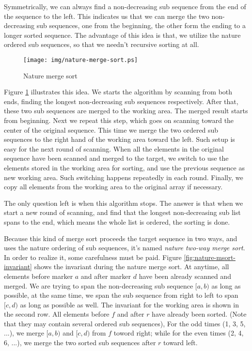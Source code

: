 \documentclass[UTF8]{article}
\begin{document}
Symmetrically, we can always find a non-decreasing sub sequence from the end of the sequence
to the left. This indicates us that we can merge the two non-decreasing sub sequences, one
from the beginning, the other form the ending to a longer sorted sequence. The advantage of
this idea is that, we utilize the nature ordered sub sequences, so that we needn't recursive
sorting at all.

\begin{figure}[htbp]
 \centering
 \texttt{[image: img/nature-merge-sort.ps]}
 \caption{Nature merge sort}
 \label{fig:nature-merge-sort}
\end{figure}

Figure \ref{fig:nature-merge-sort} illustrates this idea. We starts the algorithm by scanning
from both ends, finding the longest non-decreasing sub sequences respectively. After that,
these two sub sequences are merged to the working area. The merged result starts from beginning.
Next we repeat this step, which goes on scanning toward the center of the original sequence.
This time we merge the two ordered sub sequences to the right hand of the working area toward
the left. Such setup is easy for the next round of scanning. When all the elements
in the original sequence have been scanned and merged to the target, we switch to use the
elements stored in the working area for sorting, and use the previous sequence as new working area.
Such switching happens repeatedly in each round. Finally, we copy all elements from the
working area to the original array if necessary.

The only question left is when this algorithm stops. The answer is that when we start
a new round of scanning, and find that the longest non-decreasing sub list spans to the
end, which means the whole list is ordered, the sorting is done.

Because this kind of merge sort proceeds the target sequence in two ways, and uses the
nature ordering of sub sequences, it's named {\em nature two-way merge sort}. In order
to realize it, some carefulness must be paid. Figure \ref{fig:nature-msort-invariant}
shows the invariant during the nature merge sort. At anytime, all elements before marker
$a$ and after marker $d$ have been already scanned and merged. We are trying to
span the non-decreasing sub sequence $[a, b)$ as long as possible, at the same time,
we span the sub sequence from right to left to span $[c, d)$ as long as possible as well.
The invariant for the working area is shown in the second row. All elements before
$f$ and after $r$ have already been sorted. (Note that they may contain several
ordered sub sequences), For the odd times (1, 3, 5, ...), we merge $[a, b)$ and $[c, d)$
from $f$ toword right; while for the even times (2, 4, 6, ...), we merge the two
sorted sub sequences after $r$ toward left.
\end{document}
